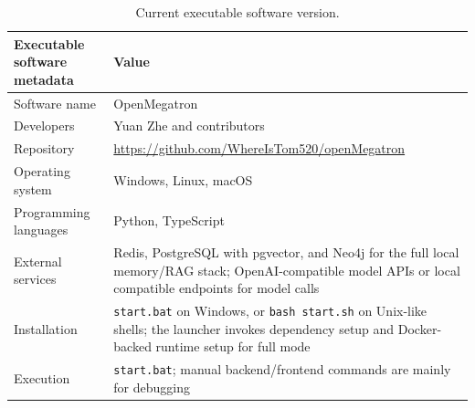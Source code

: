 \documentclass[preprint,12pt,a4paper]{elsarticle}
\begin{document}
\begin{table}[!h]
\centering
\begin{tabularx}{\textwidth}{|p{4cm}|X|}
\hline
\textbf{Executable software metadata} & \textbf{Value} \\
\hline
Software name & OpenMegatron \\
\hline
Developers & Yuan Zhe and contributors \\
\hline
Repository & \url{https://github.com/WhereIsTom520/openMegatron} \\
\hline
Operating system & Windows, Linux, macOS \\
\hline
Programming languages & Python, TypeScript \\
\hline
External services & Redis, PostgreSQL with pgvector, and Neo4j for the full local memory/RAG stack; OpenAI-compatible model APIs or local compatible endpoints for model calls \\
\hline
Installation & \texttt{start.bat} on Windows, or \texttt{bash start.sh} on Unix-like shells; the launcher invokes dependency setup and Docker-backed runtime setup for full mode \\
\hline
Execution & \texttt{start.bat}; manual backend/frontend commands are mainly for debugging \\
\hline
\end{tabularx}
\caption{Current executable software version.}
\end{table}



\end{document}
